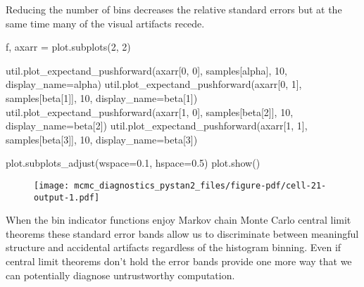 \documentclass[
  letterpaper,
  DIV=11,
  numbers=noendperiod]{scrartcl}
\newenvironment{Shaded}{\begin{snugshade}}{\end{snugshade}}
\newcommand{\DecValTok}[1]{\textcolor[rgb]{0.68,0.00,0.00}{#1}}
\newcommand{\FloatTok}[1]{\textcolor[rgb]{0.68,0.00,0.00}{#1}}
\newcommand{\NormalTok}[1]{\textcolor[rgb]{0.00,0.23,0.31}{#1}}
\newcommand{\OperatorTok}[1]{\textcolor[rgb]{0.37,0.37,0.37}{#1}}
\newcommand{\StringTok}[1]{\textcolor[rgb]{0.13,0.47,0.30}{#1}}
\begin{document}
Reducing the number of bins decreases the relative standard errors but
at the same time many of the visual artifacts recede.

\begin{Shaded}
\begin{Highlighting}[]
\NormalTok{f, axarr }\OperatorTok{=}\NormalTok{ plot.subplots(}\DecValTok{2}\NormalTok{, }\DecValTok{2}\NormalTok{)}

\NormalTok{util.plot\_expectand\_pushforward(axarr[}\DecValTok{0}\NormalTok{, }\DecValTok{0}\NormalTok{], samples[}\StringTok{\textquotesingle{}alpha\textquotesingle{}}\NormalTok{], }
                                \DecValTok{10}\NormalTok{, display\_name}\OperatorTok{=}\StringTok{\textquotesingle{}alpha\textquotesingle{}}\NormalTok{)}
\NormalTok{util.plot\_expectand\_pushforward(axarr[}\DecValTok{0}\NormalTok{, }\DecValTok{1}\NormalTok{], samples[}\StringTok{\textquotesingle{}beta[1]\textquotesingle{}}\NormalTok{], }
                                \DecValTok{10}\NormalTok{, display\_name}\OperatorTok{=}\StringTok{\textquotesingle{}beta[1]\textquotesingle{}}\NormalTok{)}
\NormalTok{util.plot\_expectand\_pushforward(axarr[}\DecValTok{1}\NormalTok{, }\DecValTok{0}\NormalTok{], samples[}\StringTok{\textquotesingle{}beta[2]\textquotesingle{}}\NormalTok{], }
                                \DecValTok{10}\NormalTok{, display\_name}\OperatorTok{=}\StringTok{\textquotesingle{}beta[2]\textquotesingle{}}\NormalTok{)}
\NormalTok{util.plot\_expectand\_pushforward(axarr[}\DecValTok{1}\NormalTok{, }\DecValTok{1}\NormalTok{], samples[}\StringTok{\textquotesingle{}beta[3]\textquotesingle{}}\NormalTok{], }
                                \DecValTok{10}\NormalTok{, display\_name}\OperatorTok{=}\StringTok{\textquotesingle{}beta[3]\textquotesingle{}}\NormalTok{)}

\NormalTok{plot.subplots\_adjust(wspace}\OperatorTok{=}\FloatTok{0.1}\NormalTok{, hspace}\OperatorTok{=}\FloatTok{0.5}\NormalTok{)}
\NormalTok{plot.show()}
\end{Highlighting}
\end{Shaded}

\begin{figure}[H]

{\centering \texttt{[image: mcmc\_diagnostics\_pystan2\_files/figure-pdf/cell-21-output-1.pdf]}

}

\end{figure}

When the bin indicator functions enjoy Markov chain Monte Carlo central
limit theorems these standard error bands allow us to discriminate
between meaningful structure and accidental artifacts regardless of the
histogram binning. Even if central limit theorems don't hold the error
bands provide one more way that we can potentially diagnose
untrustworthy computation.
\end{document}
